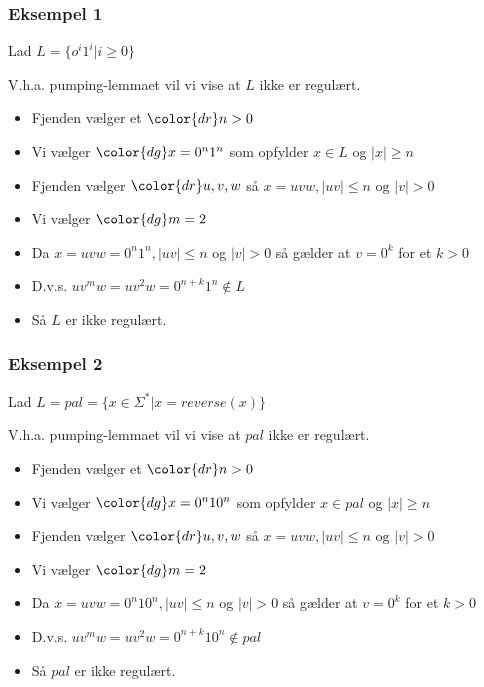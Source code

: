 \documentclass{beamer}
\begin{document}
\begin{frame}
\frametitle{Eksempel 1}
Lad $L = \{o^i1^i | i \geq 0 \}$

V.h.a. pumping-lemmaet vil vi vise at $L$ ikke er regulært.
\begin{itemize}[<+->]
\item Fjenden vælger et ${\color{dr}n}> 0$
\item Vi vælger  ${\color{dg}x=0^n1^n}$ som opfylder $x\in L$ og $|x|\geq n$
\item Fjenden vælger ${\color{dr}u,v,w}$ så $x=uvw, |uv|\leq n \text{ og } |v| > 0$
\item Vi vælger ${\color{dg}m=2}$
\item Da $x = uvw=0^n1^n, |uv|\leq n$ og $|v|>0$ så gælder at $v=0^k$ for et $k>0$
\item D.v.s. $uv^mw = uv^2w=0^{n+k}1^n \not\in L$
\item Så $L$ er \alert{ikke} regulært.
\end{itemize}
\end{frame}

\begin{frame}
\frametitle{Eksempel 2}
Lad $L = pal = \{x\in\Sigma^* | x=reverse(x) \}$

V.h.a. pumping-lemmaet vil vi vise at $pal$ ikke er regulært.

\begin{itemize}[<+->]
\item Fjenden vælger et ${\color{dr}n}> 0$
\item Vi vælger  ${\color{dg}x=0^n10^n}$ som opfylder $x\in pal$ og $|x|\geq n$
\item Fjenden vælger ${\color{dr}u,v,w}$ så $x=uvw, |uv|\leq n \text{ og } |v| > 0$
\item Vi vælger ${\color{dg}m=2}$
\item Da $x = uvw=0^n10^n, |uv|\leq n$ og $|v|>0$ så gælder at $v=0^k$ for et $k>0$
\item D.v.s. $uv^mw = uv^2w=0^{n+k}10^n \not\in pal$
\item Så $pal$ er \alert{ikke} regulært.
\end{itemize}
\end{frame}
\end{document}

